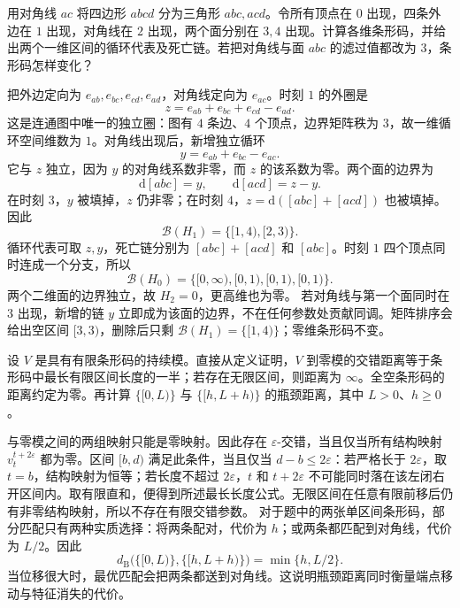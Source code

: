 \begin{exercise}\label{g2:ex:persistence-square}
	用对角线 \(ac\) 将四边形 \(abcd\) 分为三角形 \(abc,acd\)。令所有顶点在 \(0\) 出现，四条外边在 \(1\) 出现，对角线在 \(2\) 出现，两个面分别在 \(3,4\) 出现。计算各维条形码，并给出两个一维区间的循环代表及死亡链。若把对角线与面 \(abc\) 的滤过值都改为 \(3\)，条形码怎样变化？
\end{exercise}
\begin{solution}
	把外边定向为 \(e_{ab},e_{bc},e_{cd},e_{ad}\)，对角线定向为 \(e_{ac}\)。时刻 \(1\) 的外圈是
	\[
		z=e_{ab}+e_{bc}+e_{cd}-e_{ad}.
	\]
	这是连通图中唯一的独立圈：图有 \(4\) 条边、\(4\) 个顶点，边界矩阵秩为 \(3\)，故一维循环空间维数为 \(1\)。对角线出现后，新增独立循环
	\[
		y=e_{ab}+e_{bc}-e_{ac}.
	\]
	它与 \(z\) 独立，因为 \(y\) 的对角线系数非零，而 \(z\) 的该系数为零。两个面的边界为
	\[
		\mathrm d[abc]=y,\qquad \mathrm d[acd]=z-y.
	\]
	在时刻 \(3\)，\(y\) 被填掉，\(z\) 仍非零；在时刻 \(4\)，\(z=\mathrm d([abc]+[acd])\) 也被填掉。因此
	\[
		\mathcal B(H_1)=\{[1,4),[2,3)\}.
	\]
	循环代表可取 \(z,y\)，死亡链分别为 \([abc]+[acd]\) 和 \([abc]\)。时刻 \(1\) 四个顶点同时连成一个分支，所以
	\[
		\mathcal B(H_0)=\{[0,\infty),[0,1),[0,1),[0,1)\}.
	\]
	两个二维面的边界独立，故 \(H_2=0\)，更高维也为零。
	\ProseParagraphBreak
	若对角线与第一个面同时在 \(3\) 出现，新增的链 \(y\) 立即成为该面的边界，不在任何参数处贡献同调。矩阵排序会给出空区间 \([3,3)\)，删除后只剩 \(\mathcal B(H_1)=\{[1,4)\}\)；零维条形码不变。
\end{solution}

\begin{exercise}\label{g2:ex:persistence-distance-zero}
	设 \(V\) 是具有有限条形码的持续模。直接从定义证明，\(V\) 到零模的交错距离等于条形码中最长有限区间长度的一半；若存在无限区间，则距离为 \(\infty\)。全空条形码的距离约定为零。再计算 \(\{[0,L)\}\) 与 \(\{[h,L+h)\}\) 的瓶颈距离，其中 \(L>0\)、\(h\geq0\)。
\end{exercise}
\begin{solution}
	与零模之间的两组映射只能是零映射。因此存在 \(\varepsilon\)-交错，当且仅当所有结构映射 \(v_t^{t+2\varepsilon}\) 都为零。区间 \([b,d)\) 满足此条件，当且仅当 \(d-b\leq2\varepsilon\)：若严格长于 \(2\varepsilon\)，取 \(t=b\)，结构映射为恒等；若长度不超过 \(2\varepsilon\)，\(t\) 和 \(t+2\varepsilon\) 不可能同时落在该左闭右开区间内。取有限直和，便得到所述最长长度公式。无限区间在任意有限前移后仍有非零结构映射，所以不存在有限交错参数。
	\ProseParagraphBreak
	对于题中的两张单区间条形码，部分匹配只有两种实质选择：将两条配对，代价为 \(h\)；或两条都匹配到对角线，代价为 \(L/2\)。因此
	\[
		d_{\mathrm B}\bigl(\{[0,L)\},\{[h,L+h)\}\bigr)=\min\{h,L/2\}.
	\]
	当位移很大时，最优匹配会把两条都送到对角线。这说明瓶颈距离同时衡量端点移动与特征消失的代价。
\end{solution}

